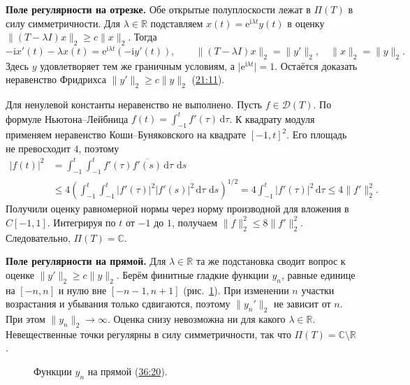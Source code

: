 \documentclass[11pt,a4paper]{article}
\theoremstyle{plain}
\theoremstyle{definition}
\newcommand{\CC}{\mathbb C}
\newcommand{\RR}{\mathbb R}
\newcommand{\Dom}{\mathcal D}
\newcommand{\id}{I}
\newcommand{\dd}{\,\mathrm d}
\newcommand{\ii}{\mathrm i}
\newcommand{\ee}{\mathrm e}
\newcommand{\norm}[1]{\lVert#1\rVert}
\newcommand{\at}[3]{\href{https://www.youtube.com/watch?v=#1&t=#2s}{#3}}
\begin{document}
\textbf{Поле регулярности на отрезке.}
Обе открытые полуплоскости лежат в $\Pi(T)$ в силу
симметричности. Для $\lambda\in\RR$ подставляем
$x(t)=\ee^{\ii\lambda t}y(t)$ в оценку
$\norm{(T-\lambda\id)x}_2\ge c\norm{x}_2$.
Тогда
\[
 -\ii x'(t)-\lambda x(t)=\ee^{\ii\lambda t}(-\ii y'(t)),\qquad
 \norm{(T-\lambda\id)x}_2=\norm{y'}_2,\quad
 \norm{x}_2=\norm{y}_2.
\]
Здесь $y$ удовлетворяет тем же граничным условиям,
а $\bigl|\ee^{\ii\lambda t}\bigr|=1$.
Остаётся доказать неравенство Фридрихса
$\norm{y'}_2\ge c\norm{y}_2$ (\at{9TaAAWmVph8}{1271}{21:11}).

Для ненулевой константы неравенство не выполнено.
Пусть $f\in\Dom(T)$. По формуле Ньютона--Лейбница
$f(t)=\int_{-1}^t f'(\tau)\dd\tau$.
К квадрату модуля применяем неравенство Коши--Буняковского
на квадрате $[-1,t]^2$. Его площадь не превосходит $4$, поэтому
\[
 \begin{aligned}
 |f(t)|^2
 &=\int_{-1}^t\!\!\int_{-1}^t f'(\tau)\overline{f'(s)}
     \dd\tau\,\dd s\\
 &\le 4\left(
   \int_{-1}^t\!\!\int_{-1}^t |f'(\tau)|^2|f'(s)|^2
   \dd\tau\,\dd s\right)^{1/2}
 =4\int_{-1}^t|f'(\tau)|^2\dd\tau
 \le4\norm{f'}_2^2.
 \end{aligned}
\]
Получили оценку равномерной нормы через норму производной
для вложения в $C[-1,1]$.
Интегрируя по $t$ от $-1$ до $1$, получаем
$\norm f_2^2\le8\norm{f'}_2^2$. Следовательно, $\Pi(T)=\CC$.

\textbf{Поле регулярности на прямой.}
Для $\lambda\in\RR$ та же подстановка сводит вопрос
к оценке $\norm{y'}_2\ge c\norm{y}_2$.
Берём финитные гладкие функции $y_n$, равные единице на
$[-n,n]$ и нулю вне $[-n-1,n+1]$ (рис.~\ref{fig:sem6-cutoff}).
При изменении $n$ участки возрастания и убывания только
сдвигаются, поэтому $\norm{y_n'}_2$ не зависит от $n$.
При этом $\norm{y_n}_2\to\infty$.
Оценка снизу невозможна ни для какого $\lambda\in\RR$.
Невещественные точки регулярны в силу симметричности,
так что $\Pi(T)=\CC\setminus\RR$.

\begin{figure}[ht]
\centering
{}
\caption{Функции $y_n$ на прямой (\at{9TaAAWmVph8}{2180}{36:20}).}
\label{fig:sem6-cutoff}
\end{figure}
\end{document}
